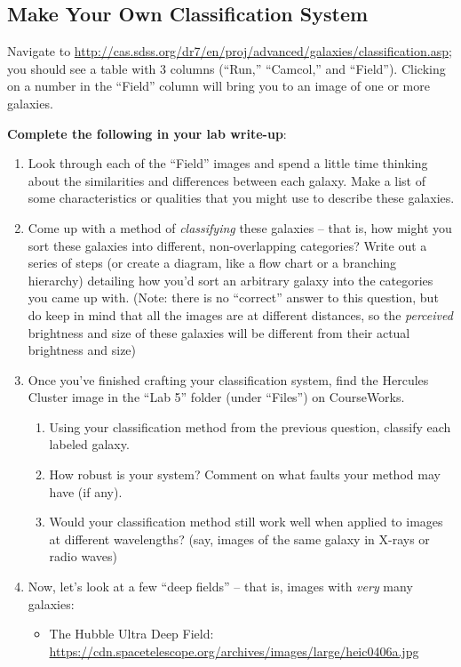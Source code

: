 \documentclass[11pt]{article}
\begin{document}
\subsection{Make Your Own Classification System}
Navigate to \url{http://cas.sdss.org/dr7/en/proj/advanced/galaxies/classification.asp}; you should see a table with 3 columns (``Run,'' ``Camcol,'' and ``Field'').  Clicking on a number in the ``Field'' column will bring you to an image of one or more galaxies.

\noindent
\textbf{Complete the following in your lab write-up}:
\begin{enumerate}
    \item Look through each of the ``Field'' images and spend a little time thinking about the similarities and differences between each galaxy. Make a list of some characteristics or qualities that you might use to describe these galaxies.
    
    \item Come up with a method of \emph{classifying} these galaxies -- that is, how might you sort these galaxies into different, non-overlapping categories? Write out a series of steps (or create a diagram, like a flow chart or a branching hierarchy) detailing how you'd sort an arbitrary galaxy into the categories you came up with. (Note: there is no ``correct'' answer to this question, but do keep in mind that all the images are at different distances, so the \emph{perceived} brightness and size of these galaxies will be different from their actual brightness and size)
    
    \item Once you've finished crafting your classification system, find the Hercules Cluster image in the ``Lab 5'' folder (under ``Files'') on CourseWorks. 
    \begin{enumerate}
        \item Using your classification method from the previous question, classify each labeled galaxy.
        
        \item How robust is your system? Comment on what faults your method may have (if any).
        
        \item Would your classification method still work well when applied to images at different wavelengths? (say, images of the same galaxy in X-rays or radio waves)
    \end{enumerate}  


    \item Now, let's look at a few ``deep fields'' -- that is, images with \emph{very} many galaxies:
    \begin{itemize}
        \item The Hubble Ultra Deep Field: \url{https://cdn.spacetelescope.org/archives/images/large/heic0406a.jpg}


\end{itemize}
\end{enumerate}
\end{document}
